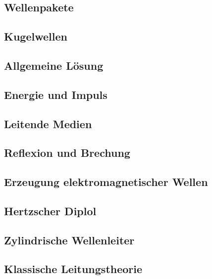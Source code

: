 \subsection{Wellenpakete}

\subsection{Kugelwellen}

\subsection{Allgemeine Lösung}

\subsection{Energie und Impuls}

\subsection{Leitende Medien}

\subsection{Reflexion und Brechung}

\subsection{Erzeugung elektromagnetischer Wellen}

\subsection{Hertzscher Diplol}

\subsection{Zylindrische Wellenleiter}

\subsection{Klassische Leitungstheorie}


